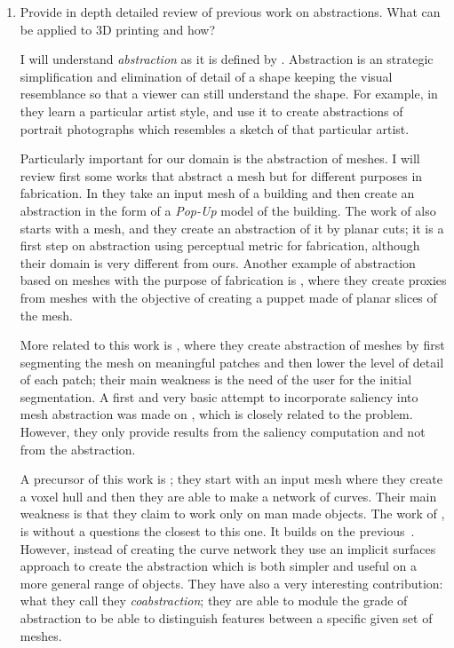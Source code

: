 \begin{enumerate}
  
	\item Provide in depth detailed review of previous work on abstractions. What can be applied to 3D printing and how?
	
		I will understand \emph{abstraction} as it is defined by \cite{Mi2009}. Abstraction is an strategic simplification and elimination of detail of a shape  keeping the visual resemblance so that a viewer can still understand the shape. For example, in \cite{Berger2013} they learn a particular artist style, and use it to create abstractions of portrait photographs which resembles a sketch of that particular artist. 
		
		Particularly important for our domain is the abstraction of meshes. I will review first some works that abstract a mesh but for different purposes in fabrication. In \cite{Li2010} they take an input mesh of a building and then create an abstraction in the form of a \emph{Pop-Up} model of the building. The work of \cite{Hildebrand2012} also starts with a mesh, and they create an abstraction of it by planar cuts; it is a first step on abstraction using perceptual metric for fabrication, although their domain is very different from ours. Another example of abstraction based on meshes with the purpose of fabrication is \cite{McCrae2011}, where they create proxies from meshes with the objective of creating a puppet made of planar slices of the mesh.
		
		More related to this work is \cite{DeGoes2011}, where they create abstraction of meshes by first segmenting the mesh on meaningful patches and then lower the level of detail of each patch; their main weakness is the need of the user for the initial segmentation. A first and very basic attempt to incorporate saliency into mesh abstraction was made on \cite{Yang2009}, which is closely related to the problem. However, they only provide results from the saliency computation and not from the abstraction. 
		
		A precursor of this work is \cite{Mehra2009}; they start with an input mesh where they create a voxel hull and then they are able to make a network of curves. Their main weakness is that they claim to work only on man made objects. The work of \cite{Yumer2012}, is without a questions the closest to this one. It builds on the previous~\cite{Mehra2009}. However, instead of creating the curve network they use an implicit surfaces approach to create the abstraction which is both simpler and useful on a more general range of objects. They have also a very interesting contribution: what they call they \emph{coabstraction}; they are able to module the grade of abstraction to be able to distinguish features between a specific given set of meshes.
	

\end{enumerate}
